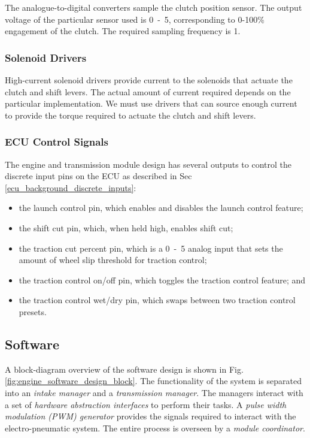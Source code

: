 The analogue-to-digital converters sample the clutch position sensor. The output voltage of the particular sensor used is \unit{0-5}{\volt}, corresponding to 0-100\% engagement of the clutch. The required sampling frequency is \unit{1}{\kilo\hertz}.

\subsubsection{Solenoid Drivers}

High-current solenoid drivers provide current to the solenoids that actuate the clutch and shift levers. The actual amount of current required depends on the particular implementation. We must use drivers that can source enough current to provide the torque required to actuate the clutch and shift levers. 
 
\subsubsection{ECU Control Signals}

The engine and transmission module design has several outputs to control the discrete input pins on the ECU as described in Sec \ref{ecu_background_discrete_inputs}:

\begin{itemize}
  \item the launch control pin, which enables and disables the launch control feature;
  \item the shift cut pin, which, when held high, enables shift cut;
  \item the traction cut percent pin, which is a \unit{0-5}{\volt} analog input that sets the amount of wheel slip threshold for traction control;
  \item the traction control on/off pin, which toggles the traction control feature; and
  \item the traction control wet/dry pin, which swaps between two traction control presets.
\end{itemize}

\subsection{Software}

A block-diagram overview of the software design is shown in Fig. \ref{fig:engine_software_design_block}. The functionality of the system is separated into an \emph{intake manager} and a \emph{transmission manager}. The managers interact with a set of \emph{hardware abstraction interfaces} to perform their tasks. A \emph{pulse width modulation (PWM) generator} provides the signals required to interact with the electro-pneumatic system. The entire process is overseen by a \emph{module coordinator}.

